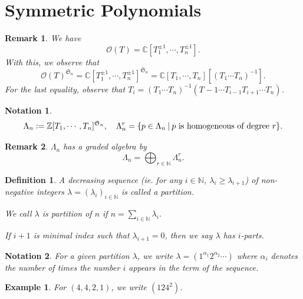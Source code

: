 \documentclass[10pt]{article}
\newtheorem{definition}{Definition}[section]
\newtheorem{notation}{Notation}[section]
\newtheorem{remark}{Remark}[section]
\newtheorem{example}{Example}[section]
\numberwithin{equation}{theorem}
\newcommand{\defeq}{\vcentcolon=}
\newcommand{\N}[0]{\mathbb{N}}
\newcommand{\Ouv}[0]{\mathcal{O}}
\newcommand{\Z}[0]{\mathbb{Z}}
\newcommand{\C}[0]{\mathbb{C}}
\newcommand{\sep}[0]{\:|\:}
\begin{document}
\section{Symmetric Polynomials}
\begin{remark}
  We have 
  \begin{equation*}
    \Ouv(T) = \C[T_1^{\pm1},\cdots,T_n^{\pm 1}].
  \end{equation*}
  With this, we observe that 
  \begin{equation*}
    \Ouv(T)^{\mathfrak{S}_n} = \C[T_1^{\pm1},\cdots,T_n^{\pm 1}]^{\mathfrak{S}_n} = \C[T_1,\cdots,T_n][(T_1\cdots T_n)^{-1}].
  \end{equation*}
  For the last equality, observe that $T_i = (T_1\cdots T_n)^{-1}(T-1\cdots T_{i-1}T_{i+1}\cdots T_n)$.
\end{remark}
\begin{notation}
  \begin{equation*}
    \Lambda_n\defeq\Z[T_1,\cdots, T_n]^{\mathfrak{S}_n},\quad \Lambda_n^r = \{p\in\Lambda_n\sep \text{$p$ is homogeneous of degree $r$}\}.
  \end{equation*}
\end{notation}
\begin{remark}
  $\Lambda_n$ has a graded algebra by 
  \begin{equation*}
    \Lambda_n = \bigoplus_{r\in\N}\Lambda_n^r.
  \end{equation*}
\end{remark}
\begin{definition}
  A decreasing sequence (ie. for any $i\in\N$, $\lambda_i\geq \lambda_{i+1}$) of non-negative integers $\lambda = (\lambda_i)_{i\in\N}$ is called a partition. 
  \par We call $\lambda$ is partition of $n$ if $n = \sum_{i\in\N} \lambda_i$. 
  \par If $i+1$ is minimal index such that $\lambda_{i+1}=0$, then we say $\lambda$ has $i$-parts.
\end{definition}
\begin{notation}
  For a given partition $\lambda$, we write $\lambda = (1^{\alpha_1}2^{\alpha_2}\cdots)$ where $\alpha_i$ denotes the number of times the number $i$ appears in the term of the sequence.
\end{notation}
\begin{example}
  For $(4,4,2,1)$, we write $(124^2)$. 
\end{example}
\end{document}
